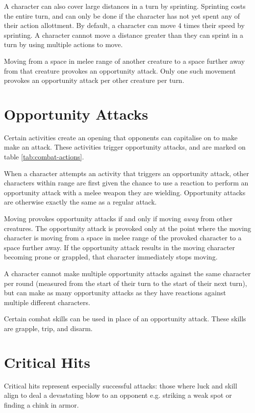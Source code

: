 \begin{multicols*}{2}
    A character can also cover large distances in a turn by sprinting.
    Sprinting costs the entire turn, and can only be done if the character has
    not yet spent any of their action allottment. By default, a character can
    move 4 times their speed by sprinting. A character cannot move a distance
    greater than they can sprint in a turn by using multiple actions to move.

    Moving from a space in melee range of another creature to a space further
    away from that creature provokes an opportunity attack. Only one such
    movement provokes an opportunity attack per other creature per turn.

    \section{Opportunity Attacks}\label{combat:opportunity-attacks}
    Certain activities create an opening that opponents can capitalise on to
    make make an attack. These activities trigger opportunity attacks, and
    are marked on table \ref{tab:combat-actions}.

    When a character attempts an activity that triggers an opportunity attack,
    other characters within range are first given the chance to use a reaction
    to perform an opportunity attack with a melee weapon they are wielding.
    Opportunity attacks are otherwise exactly the same as a regular attack.

    Moving provokes opportunity attacks if and only if moving \textit{away}
    from other creatures. The opportunity attack is provoked only at the
    point where the moving character is moving from a space in melee range of
    the provoked character to a space further away. If the opportunity attack
    results in the moving character becoming prone or grappled, that character
    immediately stops moving.

    A character cannot make multiple opportunity attacks against the same
    character per round (measured from the start of their turn to the start
    of their next turn), but can make as many opportunity attacks as they have
    reactions against multiple different characters.

    Certain combat skills can be used in place of an opportunity attack. These
    skills are grapple, trip, and disarm.

    \section{Critical Hits}\label{combat:critical-hits}
    Critical hits represent especially successful attacks: those where luck and
    skill align to deal a devastating blow to an opponent e.g. striking a weak
    spot or finding a chink in armor.


\end{multicols*}
